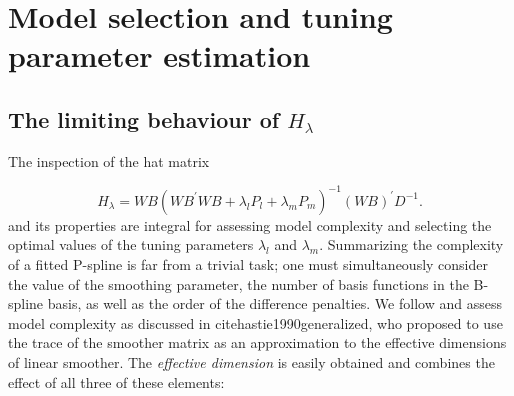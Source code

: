\documentclass[12pt]{article}
\theoremstyle{definition}
\begin{document}
\section{Model selection and tuning parameter estimation}

\subsection{The limiting behaviour of $H_\lambda$}


The inspection of the hat matrix 

\[
H_\lambda = W B\left(W B^\prime W B +  \lambda_l P_l + \lambda_m P_m \right)^{-1} \left(W B\right)^\prime D^{-1}.
\]
\noindent
and its properties are integral for assessing model complexity and selecting the optimal values of the tuning parameters $\lambda_l$ and $\lambda_m.$  Summarizing the complexity of a fitted P-spline is far from a trivial task; one must simultaneously consider the value of the smoothing parameter, the number of basis functions in the B-spline basis, as well as the order of the difference penalties. We follow \cite{eilers1996flexible} and\cite{marx2005multidimensional} assess model complexity as discussed in cite{hastie1990generalized}, who proposed to use the trace of the smoother matrix as an approximation  to the effective dimensions of linear smoother. The \emph{effective dimension} is easily obtained and combines the effect of all three of these elements: 

%
\end{document}
